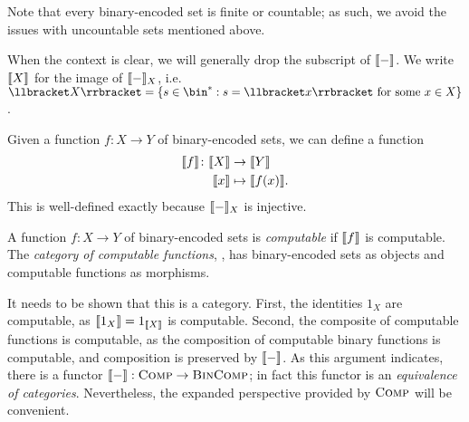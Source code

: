 Note that every binary-encoded set is finite or countable; as such, we avoid the
issues with uncountable sets mentioned above.

\begin{ntn}
  When the context is clear, we will generally drop the subscript of
  $\llbracket - \rrbracket$. We write $\llbracket X \rrbracket$ for the image of $\llbracket - \rrbracket_X$, i.e.
  $\denote{X} = \{s\in\bin^*: s = \denote{x}\text{ for some }x\in X\}$.
\end{ntn}

Given a function $f: X\to Y$ of binary-encoded sets, we can define a function
  \begin{align*}
    \llbracket f \rrbracket \colon \llbracket X \rrbracket &\to \llbracket Y \rrbracket\\
    \llbracket x \rrbracket &\mapsto \llbracket f(x) \rrbracket.
  \end{align*}
This is well-defined exactly because $\llbracket - \rrbracket_X$ is injective.

\begin{dfn}
  A function $f: X\to Y$ of binary-encoded sets is \emph{computable} if
  $\llbracket f \rrbracket$ is computable. The \emph{category of computable functions},
  , has binary-encoded sets as objects and computable functions as
  morphisms.
\end{dfn}

It needs to be shown that this is a category. First, the identities
$1_X$ are computable, as $\llbracket 1_X \rrbracket = 1_{\llbracket X \rrbracket}$ is computable. Second,
the composite of computable functions is computable, as the composition of
computable binary functions is computable, and composition is preserved by
$\llbracket - \rrbracket$. As this argument indicates, there is a functor $\llbracket - \rrbracket:
{\textsc{\text{Comp}}}\to{\textsc{\text{BinComp}}}$; in fact this functor is an \emph{equivalence of
categories}. Nevertheless, the expanded perspective provided by ${\textsc{\text{Comp}}}$ will be
convenient.

